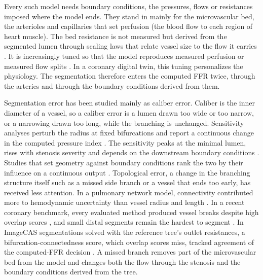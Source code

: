 \documentclass[journal,twoside,web]{ieeecolor}
\begin{document}
Every such model needs boundary conditions, the pressures, flows or resistances imposed where the model ends. They
stand in mainly for the microvascular bed, the arterioles and capillaries that set perfusion (the blood flow to each region of heart
muscle). The bed resistance is not measured but derived from the segmented lumen through
scaling laws that relate vessel size to the flow it carries \cite{murray1926,kim2010}. It is increasingly tuned so that the model reproduces measured perfusion \cite{menon2024} or measured flow splits \cite{arminio2026}. In a coronary digital twin, this tuning personalizes the physiology. The segmentation therefore enters the computed FFR twice, through the arteries and through the boundary conditions derived from them.

Segmentation error has been studied mainly as caliber error. Caliber is the inner diameter of a vessel, so a caliber error is a lumen drawn too wide or too narrow, or a narrowing drawn too long, while the branching is unchanged. Sensitivity analyses perturb the radius at fixed bifurcations and report a continuous change in the computed pressure index \cite{sankaran2015tmi,sankaran2015cmame,fernandez2024,dalmaso2025}. The sensitivity peaks at the minimal lumen, rises with stenosis severity \cite{fernandez2024} and depends on the downstream boundary conditions \cite{sankaran2015tmi}. Studies that set geometry against
boundary conditions rank the two by their influence on a continuous output \cite{sankaran2016,tanade2022,korte2023}. Topological error, a change in the branching structure itself such as a missed side branch or a vessel that ends too early, has received less attention. In a pulmonary network model, connectivity contributed more to hemodynamic uncertainty than vessel radius and
length \cite{colebank2019}. In a recent coronary benchmark, every evaluated method produced vessel breaks despite high overlap scores \cite{bransby2026}, and small distal segments remain the hardest to segment
\cite{chen2025}. In ImageCAS segmentations solved with the reference tree's outlet resistances, a bifurcation-connectedness score, which overlap scores miss, tracked agreement of the computed-FFR decision \cite{owusu2026}. A missed branch removes part of the microvascular bed from the model and changes both the flow
through the stenosis and the boundary conditions derived from the tree.
\end{document}
